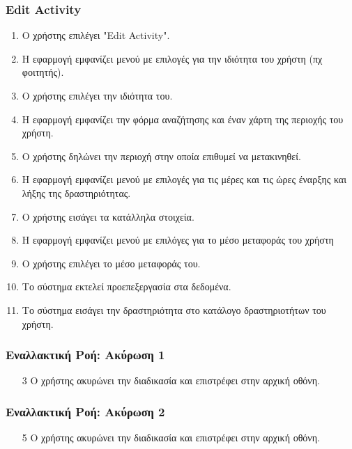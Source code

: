 \subsubsection{Edit Activity}

\begin{enumerate}
    \item Ο χρήστης επιλέγει "Edit Activity".
    \item Η εφαρμογή εμφανίζει μενού με επιλογές για την ιδιότητα του χρήστη (πχ φοιτητής).
    \item Ο χρήστης επιλέγει την ιδιότητα του.
    \item Η εφαρμογή εμφανίζει την φόρμα αναζήτησης και έναν χάρτη της περιοχής του χρήστη.
    \item Ο χρήστης δηλώνει την περιοχή στην οποία επιθυμεί να μετακινηθεί.
    \item Η εφαρμογή εμφανίζει μενού με επιλογές για τις μέρες και τις ώρες έναρξης και λήξης
          της δραστηριότητας.
    \item Ο χρήστης εισάγει τα κατάλληλα στοιχεία.
    \item H εφαρμογή εμφανίζει μενού με επιλόγες για το μέσο μεταφοράς του χρήστη
    \item Ο χρήστης επιλέγει το μέσο μεταφοράς του.
    \item Το σύστημα εκτελεί προεπεξεργασία στα δεδομένα.
    \item Το σύστημα εισάγει την δραστηριότητα στο κατάλογο δραστηριοτήτων του χρήστη.
\end{enumerate}

\subsubsection{Εναλλακτική Ροή: Ακύρωση 1}

\begin{enumerate}
    \item[3] Ο χρήστης ακυρώνει την διαδικασία και επιστρέφει στην αρχική οθόνη.
\end{enumerate}

\subsubsection{Εναλλακτική Ροή: Ακύρωση 2}

\begin{enumerate}
    \item[5] Ο χρήστης ακυρώνει την διαδικασία και επιστρέφει στην αρχική οθόνη.
\end{enumerate}

